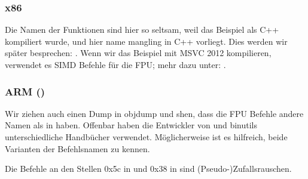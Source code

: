 

\subsubsection{x86}


Die Namen der Funktionen sind hier so seltsam, weil das Beispiel als C++ kompiliert wurde, und hier name mangling in C++
vorliegt. Dies werden wir später besprechen: .
Wenn wir das Beispiel mit MSVC 2012 kompilieren, verwendet es SIMD Befehle für die FPU; mehr dazu unter:
.

\iffalse
A BUG HERE
\subsubsection{MIPS}


Hier wurde auch ein unnützer \INS{LUI} Befehl aus unerfindlichen Gründen hinzugefügt.
Wir haben solch ein Artefakt schon früher betrachtet: \myref{MIPS_FPU_LUI}.
\fi

\subsubsection{ARM (\ARMMode)}



Wir ziehen auch einen Dump in objdump und shen, dass die FPU Befehle andere Namen als in \IDA haben.
Offenbar haben die Entwickler von \IDA und binutils unterschiedliche Handbücher verwendet.
Möglicherweise ist es hilfreich, beide Varianten der Befehlsnamen zu kennen.



Die Befehle an den Stellen 0x5c in  und 0x38 in \main sind (Pseudo-)Zufallsrauschen.

